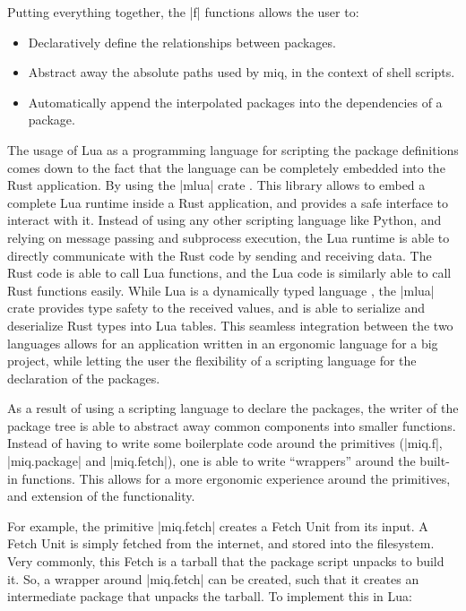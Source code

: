 Putting everything together, the |f| functions allows the
user to:

\begin{itemize}
    \item Declaratively define the relationships between packages.
    \item Abstract away the absolute paths used by miq, in
    the context of shell scripts.
    \item Automatically append the interpolated packages
    into the dependencies of a package.
\end{itemize}

The usage of Lua as a programming language for scripting the
package definitions comes down to the fact that the language
can be completely embedded into the Rust application. By
using the |mlua| crate \cite{MluaRust} . This library allows
to embed a complete Lua runtime inside a Rust application,
and provides a safe interface to interact with it. Instead
of using any other scripting language like Python, and
relying on message passing and subprocess execution, the Lua
runtime is able to directly communicate with the Rust code
by sending and receiving data. The Rust code is able to call
Lua functions, and the Lua code is similarly able to call
Rust functions easily. While Lua is a dynamically typed
language , the |mlua| crate provides type safety to the
received values, and is able to serialize and deserialize
Rust types into Lua tables. This seamless integration
between the two languages allows for an application written
in an ergonomic language for a big project, while letting
the user the flexibility of a scripting language for the
declaration of the packages.

As a result of using a scripting language to declare the
packages, the writer of the package tree is able to abstract
away common components into smaller functions. Instead of
having to write some boilerplate code around the primitives
(|miq.f|, |miq.package| and |miq.fetch|), one is able to
write ``wrappers'' around the built-in functions. This
allows for a more ergonomic experience around the
primitives, and extension of the functionality.

For example,
the primitive |miq.fetch| creates a Fetch Unit from its
input. A Fetch Unit is simply fetched from the internet, and
stored into the filesystem. Very commonly, this Fetch is a
tarball that the package script unpacks to build it. So, a
wrapper around |miq.fetch| can be created, such that it
creates an intermediate package that unpacks the tarball.
To implement this in Lua:

